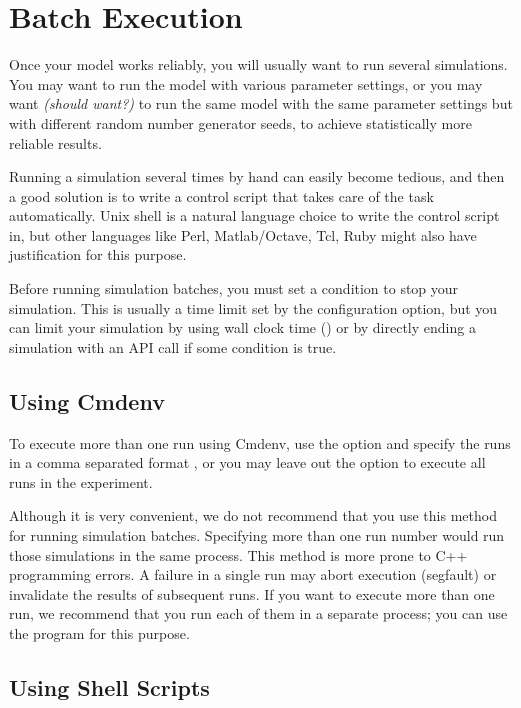 \section{Batch Execution}
\label{sec:ch-run-sim:batch-execution}

Once your model works reliably, you will usually want to run several
simulations. You may want to run the model with various
parameter settings, or you may want \textit{(should want?)} to
run the same model with the same parameter settings but with
different random number generator seeds, to achieve statistically
more reliable results.

Running a simulation several times by hand can easily become tedious,
and then a good solution is to write a control script that
takes care of the task automatically. Unix shell is
a natural language choice to write the control script in,
but other languages like Perl, Matlab/Octave, Tcl, Ruby might also have
justification for this purpose.

Before running simulation batches, you must set a condition to
stop your simulation. This is usually a time limit set by the
 configuration option, but you can limit your simulation
by using wall clock time () or by directly ending a
simulation with an API call if some condition is true.

\subsection{Using Cmdenv}

To execute more than one run using Cmdenv, use the  option
and specify the runs in a comma separated format , or you may leave
out the  option to execute all runs in the experiment.

\begin{warning}
  Although it is very convenient, we do not recommend that you use this method for
  running simulation batches. Specifying more than one run number
  would run those simulations in the same process. This method is more prone to C++ programming
  errors. A failure in a single run may abort execution (segfault) or invalidate the results of subsequent runs. If you want
  to execute more than one run, we recommend that you run each of them in a separate process;
  you can use the  program for this purpose.
\end{warning}


\subsection{Using Shell Scripts}

